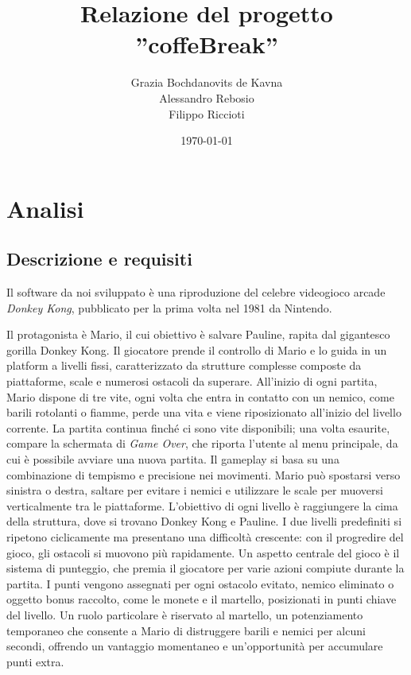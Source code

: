 \documentclass[a4paper,12pt]{report}
\title{Relazione del progetto\\''coffeBreak''}
\author{Grazia Bochdanovits de Kavna\\
Alessandro Rebosio\\
Filippo Riccioti
}
\date{\today}
\begin{document}
\maketitle

\tableofcontents

\chapter{Analisi}

\section{Descrizione e requisiti}
Il software da noi sviluppato è una riproduzione del celebre videogioco arcade \textit{Donkey Kong}, pubblicato per la prima volta nel 1981 da Nintendo.

Il protagonista è Mario, il cui obiettivo è salvare Pauline, rapita dal gigantesco gorilla Donkey Kong.
%
Il giocatore prende il controllo di Mario e lo guida in un platform a livelli fissi, caratterizzato da strutture complesse
composte da piattaforme, scale e numerosi ostacoli da superare.
%
All'inizio di ogni partita, Mario dispone di tre vite, ogni volta che entra in contatto con un nemico, come barili rotolanti o fiamme, perde una vita e viene riposizionato
all'inizio del livello corrente.
%
La partita continua finché ci sono vite disponibili; una volta esaurite, compare la schermata di \textit{Game Over},
che riporta l'utente al menu principale, da cui è possibile avviare una nuova partita.
%
Il gameplay si basa su una combinazione di tempismo e precisione nei movimenti.
Mario può spostarsi verso sinistra o destra, saltare per evitare i nemici e utilizzare le scale per muoversi verticalmente tra le piattaforme.
L'obiettivo di ogni livello è raggiungere la cima della struttura, dove si trovano Donkey Kong e Pauline.
%
I due livelli predefiniti si ripetono ciclicamente ma presentano una difficoltà crescente:
con il progredire del gioco, gli ostacoli si muovono più rapidamente.
%
Un aspetto centrale del gioco è il sistema di punteggio, che premia il giocatore per varie azioni compiute durante la partita.
I punti vengono assegnati per ogni ostacolo evitato, nemico eliminato o oggetto bonus raccolto, come le monete e il martello,
posizionati in punti chiave del livello.
%
Un ruolo particolare è riservato al martello, un potenziamento temporaneo che consente a Mario di distruggere barili e nemici per alcuni secondi,
offrendo un vantaggio momentaneo e un'opportunità per accumulare punti extra.
\end{document}
